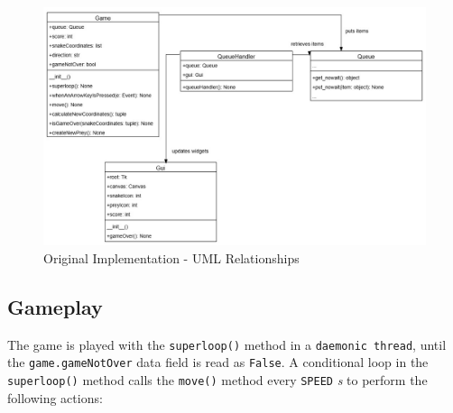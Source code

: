 \documentclass{article}
\begin{document}
\begin{figure}[H]
    \centering
     \includegraphics[width=1.0\textwidth]{../Original_ClassDiagrams.jpg}
     \caption{Original Implementation - UML Relationships}
     \label{fig:Original_ClassDiagrams}
 \end{figure}

\subsection{Gameplay}

The game is played with the \texttt{superloop()} method in a \texttt{daemonic thread}, until the \texttt{game.gameNotOver} data field is read as \texttt{False}.
A conditional loop in the \texttt{superloop()} method calls the \texttt{move()} method
every \texttt{SPEED} \textit{s} to perform the following actions:
\end{document}
